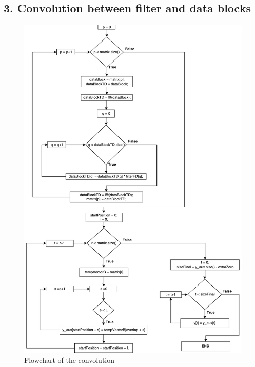 \begin{refsection}
\subsection*{3. Convolution between filter and data blocks}
\begin{figure}[h]
	\centering
	\includegraphics[width=13cm]{./algorithms/overlap_save/figures/convolution_part2.pdf}
	\caption{Flowchart of the convolution}
	\label{convolution_part2}
\end{figure}


\newpage

\end{refsection}
